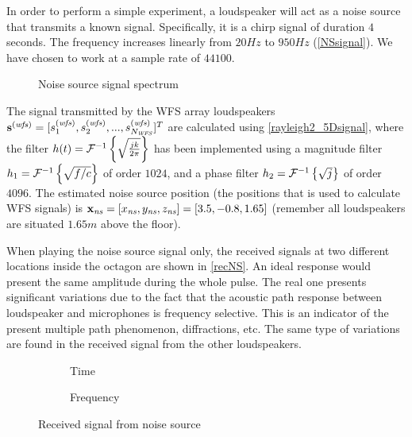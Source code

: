 In order to perform a simple experiment, a loudspeaker will act as a noise source that transmits a known signal. Specifically, it is a chirp signal of duration $4$ seconds. The frequency increases linearly from $20 \si{Hz}$ to $950\si{Hz}$ (\autoref{NSsignal}). We have chosen to work at a sample rate of $44100$.
\begin{figure}[h]
	\centering
	\def\svgwidth{0.9\columnwidth}
	\graphicspath{{Img/}}
	{\fontsize{5}{12}\selectfont
		
	}
	\caption{Noise source signal spectrum}
	\label{NSsignal}
\end{figure}

The signal transmitted by the WFS array loudspeakers $\vec{\signal[wfs][time]} = [\signal[wfs][time]_1, \signal[wfs][time]_2, ..., \signal[wfs][time]_{\numWFS}]^T$ are calculated using \autoref{rayleigh2_5Dsignal}, where the filter $\freqFilter(t) = \FourierTransform{\sqrt{\frac{jk}{2\pi}}}[inverse]$ has been implemented using a magnitude filter $\freqFilter[time][magnitude] = \FourierTransform{\sqrt{f/c}}[inverse]$ of order $1024$, and a phase filter $\freqFilter[time][phase] = \FourierTransform{\sqrt{j}}[inverse]$ of order $4096$. The estimated noise source position (the positions that is used to calculate WFS signals) is $\Position[ns] = [\Position[ns][x], \Position[ns][y], \Position[ns][z]] = [3.5, -0.8, 1.65]$ (remember all loudspeakers are situated $1.65\si{m}$ above the floor).

When playing the noise source signal only, the received signals at two different locations inside the octagon are shown in \autoref{recNS}. An ideal response would present the same amplitude during the whole pulse. The real one presents significant variations due to the fact that the acoustic path response between loudspeaker and microphones is frequency selective. This is an indicator of the present multiple path phenomenon, diffractions, etc. The same type of variations are found in the received signal from the other loudspeakers. %

\begin{figure}
	\begin{subfigure}[b]{0.49\textwidth}
		\centering
		\def\svgwidth{0.9\columnwidth}
		\graphicspath{{Img/}}
		{\fontsize{5}{12}\selectfont
			
		}
		\caption{Time}
	\end{subfigure}
	\begin{subfigure}[b]{0.49\textwidth}
		\centering
		\def\svgwidth{0.9\columnwidth}
		\graphicspath{{Img/}}
		{\fontsize{5}{12}\selectfont
			
		}
		\caption{Frequency}
	\end{subfigure}
	\caption{Received signal from noise source}
	\label{recNS}
\end{figure}

